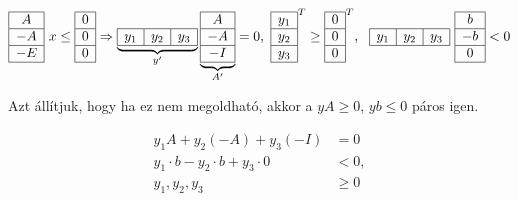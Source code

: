 \begin{displaymath}
	\begin{array}{|c|c|c|}
		\hline
		A  \\ \hline
		-A \\ \hline
		-E \\  \hline
	\end{array}
	~ x\leq
	\begin{array}{|c|c|c|}
		\hline
		0 \\ \hline
		0 \\ \hline
		0 \\  \hline
	\end{array}
	\Rightarrow
	\underbrace{
		\begin{array}{|c|c|c|}
			\hline
			y_1 & y_2 & y_3 \\
			\hline
		\end{array}}_{y'}
	\underbrace{
		\begin{array}{|c|}
			\hline
			A  \\
			\hline
			-A \\
			\hline
			-I \\
			\hline
		\end{array}}_{A'}
	=0,~
	\begin{array}{|c|}
		\hline
		y_1 \\\hline
		y_2 \\\hline
		y_3 \\
		\hline
	\end{array}^T
	\geq
	\begin{array}{|c|}
		\hline
		0 \\\hline
		0 \\\hline
		0 \\
		\hline
	\end{array}^T,~
	~
	\begin{array}{|c|c|c|}
		\hline
		y_1 &
		y_2 &
		y_3   \\
		\hline
	\end{array}
	~
	\begin{array}{|c|}
		\hline
		b  \\\hline
		-b \\\hline
		0  \\
		\hline
	\end{array}
	<0
\end{displaymath}

Azt állítjuk, hogy ha ez nem megoldható, akkor a $ yA \geq 0$, $yb \leq 0$ páros
igen.

\begin{align*}
	y_1 A + y_2 (-A) + y_3(-I)              & = 0    \\
	y_1 \cdot b - y_2 \cdot b + y_3 \cdot 0 & <0,    \\
	y_1, y_2, y_3                           & \geq 0
\end{align*}

